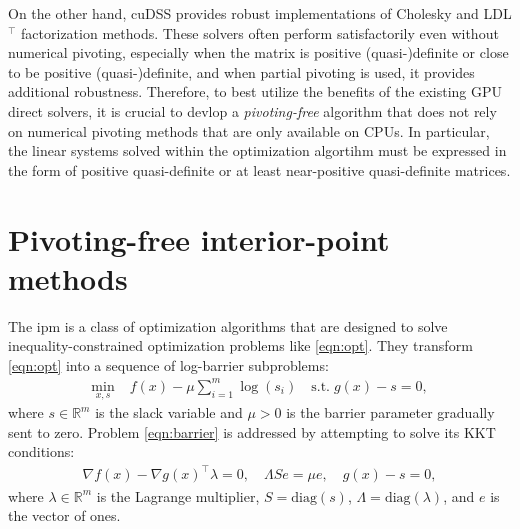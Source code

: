\documentclass{article}
\begin{document}
On the other hand, cuDSS provides robust implementations of Cholesky and LDL$^\top$ factorization methods. These solvers often perform satisfactorily even without numerical pivoting, especially when the matrix is positive (quasi-)definite or close to be positive (quasi-)definite, and when partial pivoting is used, it provides additional robustness.
Therefore, to best utilize the benefits of the existing GPU direct solvers, it is crucial to devlop a \emph{pivoting-free} algorithm that does not rely on numerical pivoting methods that are only available on CPUs.
In particular, the linear systems solved within the optimization algortihm must be expressed in the form of positive quasi-definite or at least near-positive quasi-definite matrices.


\section{Pivoting-free interior-point methods}\label{eqn:ipm}
The \gls*{ipm} is a class of optimization algorithms that are designed to solve inequality-constrained optimization problems like \cref{eqn:opt}. They transform \cref{eqn:opt} into a sequence of log-barrier subproblems:
\begin{align}\label{eqn:barrier}
  \min_{x,s } \; & f(x) - \mu \sum_{i=1}^m \log(s_i) \quad \text{s.t.} \; g(x) - s = 0 ,
\end{align}
where $s \in \mathbb{R}^m$ is the slack variable and $\mu > 0$ is the barrier parameter gradually sent to zero. Problem \cref{eqn:barrier} is addressed by attempting to solve its KKT conditions:
\begin{align}\label{eqn:kkt}
  \nabla f(x) - \nabla g(x)^\top \lambda = 0, \quad
  \Lambda S e = \mu e,\quad
  g(x) - s =   0 ,
\end{align}
where $\lambda \in \mathbb{R}^m$ is the Lagrange multiplier, $S = \text{diag}(s)$,
 $\Lambda = \text{diag}(\lambda)$, and $e$ is the vector of ones.
\end{document}
